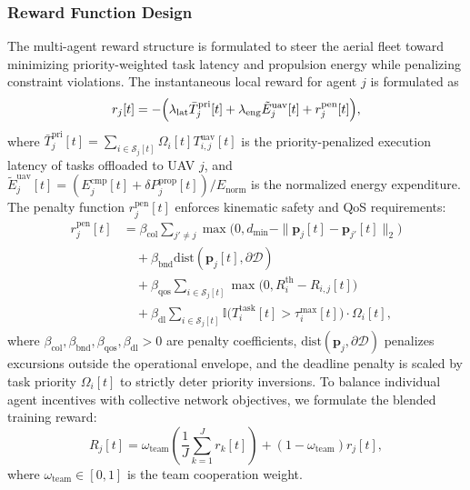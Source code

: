 \documentclass[journal]{IEEEtran}
\begin{document}
\subsubsection{Reward Function Design}
The multi-agent reward structure is formulated to steer the aerial fleet toward minimizing priority-weighted task latency and propulsion energy while penalizing constraint violations. The instantaneous local reward for agent $j$ is formulated as
\begin{equation}
    r_j[t] = - \Bigl( \lambda_{\mathrm{lat}} \bar{T}_j^{\mathrm{pri}}[t] + \lambda_{\mathrm{eng}} \tilde{E}_j^{\mathrm{uav}}[t] + r_j^{\mathrm{pen}}[t] \Bigr),
    \label{eq:agent_reward}
\end{equation}
where $\bar{T}_j^{\mathrm{pri}}[t] = \sum_{i \in \mathcal{S}_j[t]} \Omega_i[t] T_{i,j}^{\mathrm{uav}}[t]$ is the priority-penalized execution latency of tasks offloaded to UAV $j$, and $\tilde{E}_j^{\mathrm{uav}}[t] = (E_j^{\mathrm{cmp}}[t] + \delta P_j^{\mathrm{prop}}[t])/E_{\mathrm{norm}}$ is the normalized energy expenditure. The penalty function $r_j^{\mathrm{pen}}[t]$ enforces kinematic safety and QoS requirements:
\begin{equation}
\begin{split}
    r_j^{\mathrm{pen}}[t] &= \beta_{\mathrm{col}} \sum_{j' \neq j} \max\bigl(0, d_{\min} - \|\mathbf{p}_j[t] - \mathbf{p}_{j'}[t]\|_2\bigr) \\
    &\quad + \beta_{\mathrm{bnd}} \mathrm{dist}(\mathbf{p}_j[t], \partial\mathcal{D}) \\
    &\quad + \beta_{\mathrm{qos}} \sum_{i \in \mathcal{S}_j[t]} \max\bigl(0, R_i^{\mathrm{th}} - R_{i,j}[t]\bigr) \\
    &\quad + \beta_{\mathrm{dl}} \sum_{i \in \mathcal{S}_j[t]} \mathbb{I}\bigl(T_i^{\mathrm{task}}[t] > \tau_i^{\max}[t]\bigr) \cdot \Omega_i[t],
\end{split}
\label{eq:penalty_terms}
\end{equation}
where $\beta_{\mathrm{col}}, \beta_{\mathrm{bnd}}, \beta_{\mathrm{qos}}, \beta_{\mathrm{dl}} > 0$ are penalty coefficients, $\mathrm{dist}(\mathbf{p}_j, \partial\mathcal{D})$ penalizes excursions outside the operational envelope, and the deadline penalty is scaled by task priority $\Omega_i[t]$ to strictly deter priority inversions. To balance individual agent incentives with collective network objectives, we formulate the blended training reward:
\begin{equation}
    R_j[t] = \omega_{\mathrm{team}} \left(\frac{1}{J}\sum_{k=1}^J r_k[t]\right) + (1 - \omega_{\mathrm{team}}) r_j[t],
    \label{eq:blended_reward}
\end{equation}
where $\omega_{\mathrm{team}} \in [0, 1]$ is the team cooperation weight.
\end{document}
